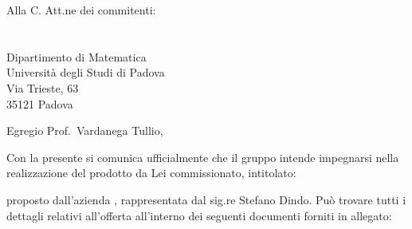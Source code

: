 \documentclass[a4paper,12pt]{letteracdp}
\date{2017-01-11}
\begin{document}
  \begin{letter}{
    Alla C. Att.ne dei commitenti: \\
    \COMMITTENTE \\
    \CARDIN      \\
    Dipartimento di Matematica \\
		Università degli Studi di Padova \\
		Via Trieste, 63 \\
		35121 Padova}
		
    \opening{Egregio Prof.~Vardanega Tullio,}
    Con la presente si comunica ufficialmente che il gruppo intende impegnarsi
    nella realizzazione del prodotto da Lei commissionato, intitolato:
    \begin{center}
      \CAPITOLATO
    \end{center}
    proposto dall'azienda \PROPONENTE{}, rappresentata dal sig.re Stefano Dindo.
    Può trovare tutti i dettagli relativi all'offerta all'interno dei seguenti
    documenti forniti in allegato:


\end{letter}
\end{document}
